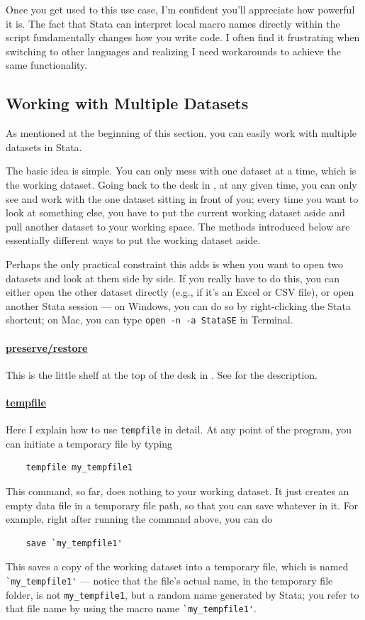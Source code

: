 Once you get used to this use case, I’m confident you’ll appreciate how powerful it is. The fact that Stata can interpret local macro names directly within the script fundamentally changes how you write code. I often find it frustrating when switching to other languages and realizing I need workarounds to achieve the same functionality.

\subsection{Working with Multiple Datasets}
As mentioned at the beginning of this section, you can easily work with multiple datasets in Stata. 

The basic idea is simple. You can only mess with one dataset at a time, which is the working dataset. Going back to the desk in , at any given time, you can only see and work with the one dataset sitting in front of you; every time you want to look at something else, you have to put the current working dataset aside and pull another dataset to your working space. The methods introduced below are essentially different ways to put the working dataset aside. 

Perhaps the only practical constraint this adds is when you want to open two datasets and look at them side by side. If you really have to do this, you can either open the other dataset directly (e.g., if it's an Excel or CSV file), or open another Stata session --- on Windows, you can do so by right-clicking the Stata shortcut; on Mac, you can type \verb|open -n -a StataSE| in Terminal. 

\paragraph{\underline{preserve/restore}} This is the little shelf at the top of the desk in . See  for the description. 

\paragraph{\underline{tempfile}} Here I explain how to use \verb|tempfile| in detail. At any point of the program, you can initiate a temporary file by typing
\begin{verbatim}
    tempfile my_tempfile1 
\end{verbatim}
This command, so far, does nothing to your working dataset. It just creates an empty data file in a temporary file path, so that you can save whatever in it. For example, right after running the command above, you can do 
\begin{verbatim}
    save `my_tempfile1' 
\end{verbatim}
This saves a copy of the working dataset into a temporary file, which is named \verb|`my_tempfile1'| --- notice that the file's actual name, in the temporary file folder, is not \verb|my_tempfile1|, but a random name generated by Stata; you refer to that file name by using the macro name \verb|`my_tempfile1'|. 

